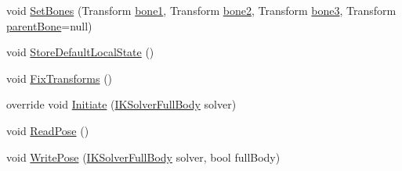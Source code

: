\begin{DoxyCompactItemize}
\item 
void \mbox{\hyperlink{class_root_motion_1_1_final_i_k_1_1_i_k_mapping_limb_aec81c5311241a3c333ca440b19fa8a0f}{Set\+Bones}} (Transform \mbox{\hyperlink{class_root_motion_1_1_final_i_k_1_1_i_k_mapping_limb_aeb108a14f3398078896309020aaeedd1}{bone1}}, Transform \mbox{\hyperlink{class_root_motion_1_1_final_i_k_1_1_i_k_mapping_limb_a2b296b91149791403d9faaef39c635dd}{bone2}}, Transform \mbox{\hyperlink{class_root_motion_1_1_final_i_k_1_1_i_k_mapping_limb_aab10d22e5556a9db8903bf53d5385181}{bone3}}, Transform \mbox{\hyperlink{class_root_motion_1_1_final_i_k_1_1_i_k_mapping_limb_af480ef05ab503917f441d275ed8c8b13}{parent\+Bone}}=null)
\item 
void \mbox{\hyperlink{class_root_motion_1_1_final_i_k_1_1_i_k_mapping_limb_ab850002f2d393d6d0d92046bb26118ad}{Store\+Default\+Local\+State}} ()
\item 
void \mbox{\hyperlink{class_root_motion_1_1_final_i_k_1_1_i_k_mapping_limb_a6ee96ea8c48d8b3640037ce7623b814f}{Fix\+Transforms}} ()
\item 
override void \mbox{\hyperlink{class_root_motion_1_1_final_i_k_1_1_i_k_mapping_limb_abae95dfedf3c3b0742e0f368f0c02666}{Initiate}} (\mbox{\hyperlink{class_root_motion_1_1_final_i_k_1_1_i_k_solver_full_body}{I\+K\+Solver\+Full\+Body}} solver)
\item 
void \mbox{\hyperlink{class_root_motion_1_1_final_i_k_1_1_i_k_mapping_limb_a245c8e88e172a550589568139339eaec}{Read\+Pose}} ()
\item 
void \mbox{\hyperlink{class_root_motion_1_1_final_i_k_1_1_i_k_mapping_limb_a2d86ec28926a1b794cf63eec1cd8b931}{Write\+Pose}} (\mbox{\hyperlink{class_root_motion_1_1_final_i_k_1_1_i_k_solver_full_body}{I\+K\+Solver\+Full\+Body}} solver, bool full\+Body)
\end{DoxyCompactItemize}
